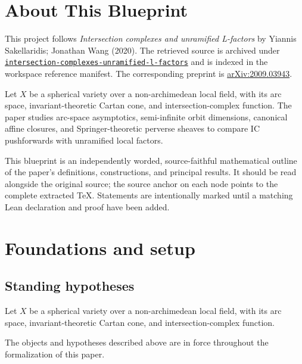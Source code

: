 

\chapter*{About This Blueprint}
\label{intersection-complexes-unramified-l-factors-about}

This project follows \emph{Intersection complexes and unramified L-factors} by Yiannis Sakellaridis; Jonathan Wang (2020). The
retrieved source is archived under
\href{../../../../../references/intersection-complexes-unramified-l-factors/}{\texttt{intersection-complexes-unramified-l-factors}} and is indexed in
the workspace reference manifest. The corresponding preprint is
\href{https://arxiv.org/abs/2009.03943}{arXiv:2009.03943}.

Let $X$ be a spherical variety over a non-archimedean local field, with its arc space, invariant-theoretic Cartan cone, and intersection-complex function. The paper studies arc-space asymptotics, semi-infinite orbit dimensions, canonical affine closures, and Springer-theoretic perverse sheaves to compare IC pushforwards with unramified local factors.

This blueprint is an independently worded, source-faithful mathematical
outline of the paper's definitions, constructions, and principal results. It
should be read alongside the original source; the source anchor on each node
points to the complete extracted TeX. Statements are intentionally marked
\notready until a matching Lean declaration and proof have been added.

\chapter{Foundations and setup}
\label{chap:intersection-complexes-unramified-l-factors-foundations}

\section{Standing hypotheses}
\label{sec:intersection-complexes-unramified-l-factors-standing}

Let $X$ be a spherical variety over a non-archimedean local field, with its arc space, invariant-theoretic Cartan cone, and intersection-complex function.

\begin{convention}
\label{intersection-complexes-unramified-l-factors-setup}
The objects and hypotheses described above are in force throughout the
formalization of this paper.
\notready
\end{convention}


